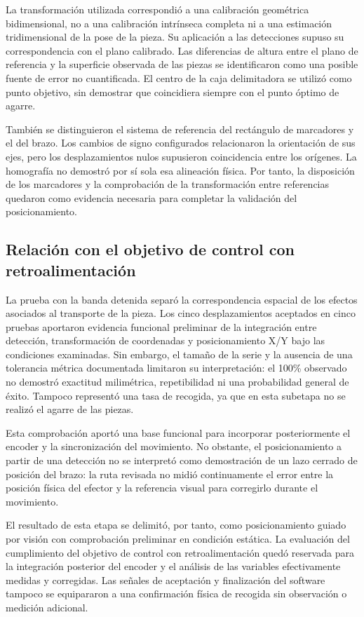 La transformación utilizada correspondió a una calibración geométrica bidimensional, no a una calibración intrínseca completa ni a una estimación tridimensional de la pose de la pieza. Su aplicación a las detecciones supuso su correspondencia con el plano calibrado. Las diferencias de altura entre el plano de referencia y la superficie observada de las piezas se identificaron como una posible fuente de error no cuantificada. El centro de la caja delimitadora se utilizó como punto objetivo, sin demostrar que coincidiera siempre con el punto óptimo de agarre.

También se distinguieron el sistema de referencia del rectángulo de marcadores y el del brazo. Los cambios de signo configurados relacionaron la orientación de sus ejes, pero los desplazamientos nulos supusieron coincidencia entre los orígenes. La homografía no demostró por sí sola esa alineación física. Por tanto, la disposición de los marcadores y la comprobación de la transformación entre referencias quedaron como evidencia necesaria para completar la validación del posicionamiento.

\subsection{Relación con el objetivo de control con retroalimentación}

La prueba con la banda detenida separó la correspondencia espacial de los efectos asociados al transporte de la pieza. Los cinco desplazamientos aceptados en cinco pruebas aportaron evidencia funcional preliminar de la integración entre detección, transformación de coordenadas y posicionamiento X/Y bajo las condiciones examinadas. Sin embargo, el tamaño de la serie y la ausencia de una tolerancia métrica documentada limitaron su interpretación: el 100\% observado no demostró exactitud milimétrica, repetibilidad ni una probabilidad general de éxito. Tampoco representó una tasa de recogida, ya que en esta subetapa no se realizó el agarre de las piezas.

Esta comprobación aportó una base funcional para incorporar posteriormente el encoder y la sincronización del movimiento. No obstante, el posicionamiento a partir de una detección no se interpretó como demostración de un lazo cerrado de posición del brazo: la ruta revisada no midió continuamente el error entre la posición física del efector y la referencia visual para corregirlo durante el movimiento.

El resultado de esta etapa se delimitó, por tanto, como posicionamiento guiado por visión con comprobación preliminar en condición estática. La evaluación del cumplimiento del objetivo de control con retroalimentación quedó reservada para la integración posterior del encoder y el análisis de las variables efectivamente medidas y corregidas. Las señales de aceptación y finalización del software tampoco se equipararon a una confirmación física de recogida sin observación o medición adicional.
